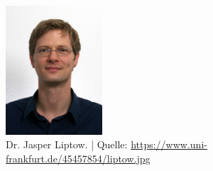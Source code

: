 \documentclass[]{scrartcl}
\begin{document}
\begin{figure}[]
	\centering
	\includegraphics[width=0.32\textwidth]{images/liptow.jpg}
	\caption{Dr. Jasper Liptow. | Quelle: \url{https://www.uni-frankfurt.de/45457854/liptow.jpg}}
	\label{fig:liptow}
\end{figure}



\end{document}
